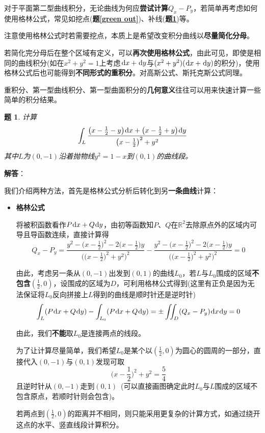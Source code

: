\documentclass[a4paper,UTF8,fontset=windows,AutoFakeBold]{ctexart}
\newcommand*{\dr}{\hspace{0.07em}\mathrm{d}}
\newcommand*{\rb}{\mathbb{R}}
\newcommand*{\note}{\noindent *}
\theoremstyle{ex}
\newtheorem{exercise}{题}
\newcommand{\exref}[1]{\textbf{题\;\ref{#1}\;}}
\newcommand{\sol}[1]{{\vspace{5pt}\kaishu\noindent\textbf{解答}：\vspace{-3pt}
\begin{compactitem}
    \item[] #1
\end{compactitem}
}}
\begin{document}
\note 对于平面第二型曲线积分，无论曲线为何应\textbf{尝试计算}$Q_x-P_y$，若简单再考虑如何使用格林公式，常见如挖点(\exref{green out})、补线(\exref{green add})等。

\note 注意使用格林公式时若需要挖点，本质上是希望改变积分曲线以\textbf{尽量简化分母}。

\note 若简化完分母后在整个区域有定义，可以\textbf{再次使用格林公式}，由此可见，即使是相同的曲线积分(如在$x^2+y^2=1$上考虑$\dr x+\dr y$与$(x^2+y^2)(\dr x+\dr y)$的积分)，使用格林公式后也可能得到\textbf{不同形式的重积分}。对高斯公式、斯托克斯公式同理。

\note 重积分、第一型曲线积分、第一型曲面积分的\textbf{几何意义}往往可以用来快速计算一些简单的积分结果。

\begin{framed}
\begin{exercise}\label{green add}
    计算
    $$\int_L\frac{\big(x-\frac{1}{2}-y\big)\dr x+\big(x-\frac{1}{2}+y\big)\dr y}{\big(x-\frac{1}{2}\big)^2+y^2}$$
    其中$L$为$(0,-1)$沿着抛物线$y^2=1-x$到$(0,1)$的曲线段。
\end{exercise}
\sol{
    我们介绍两种方法，首先是格林公式分析后转化到另\textbf{一条曲线}计算：
    \begin{itemize}
        \item \textbf{格林公式}
        
        将被积函数看作$P\dr x+Q\dr y$，由初等函数知$P$、$Q$在$\rb^2$去除原点外的区域内可导且导函数连续，直接计算得
        $$Q_x-P_y=\frac{y^2-\big(x-\frac{1}{2}\big)^2-2\big(x-\frac{1}{2}\big)y}{\big(\big(x-\frac{1}{2}\big)^2+y^2\big)^2}-\frac{y^2-\big(x-\frac{1}{2}\big)^2-2\big(x-\frac{1}{2}\big)y}{\big(\big(x-\frac{1}{2}\big)^2+y^2\big)^2}=0$$

        由此，考虑另一条从$(0,-1)$出发到$(0,1)$的曲线$L_0$，若$L$与$L_0$围成的区域\textbf{不包含$(\frac{1}{2},0)$}，设围成的区域为$D$，可利用格林公式得到(这里有正负是因为无法保证将$L_0$反向拼接上$L$得到的曲线是顺时针还是逆时针)
        $$\int_L(P\dr x+Q\dr y)-\int_{L_0}(P\dr x+Q\dr y)=\pm\iint_D(Q_x-P_y)\dr x\dr y=0$$

        \note 由此，我们\textbf{不能}取$L_0$是连接两点的线段。

        为了让计算尽量简单，我们希望$L_0$是某个以$(\frac{1}{2},0)$为圆心的圆周的一部分，直接代入$(0,-1)$与$(0,1)$发现可取
        $$\bigg(x-\frac{1}{2}\bigg)^2+y^2=\frac{5}{4}$$
        且逆时针从$(0,-1)$走到$(0,1)$\ (可以直接画图确定此时$L_0$与$L$围成的区域不包含原点，若顺时针则会包含)。

        \note 若两点到$(\frac{1}{2},0)$的距离并不相同，则只能采用更复杂的计算方式，如通过绕开这点的水平、竖直线段计算积分。


\end{itemize}}
\end{framed}
\end{document}
